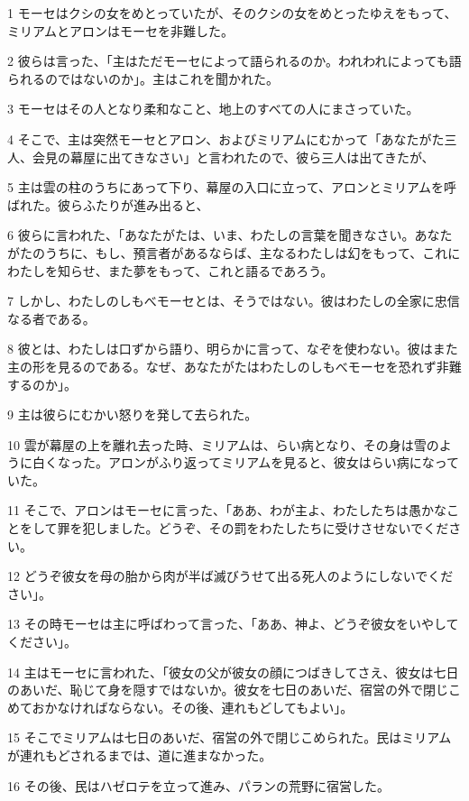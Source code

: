 \par 1 モーセはクシの女をめとっていたが、そのクシの女をめとったゆえをもって、ミリアムとアロンはモーセを非難した。
\par 2 彼らは言った、「主はただモーセによって語られるのか。われわれによっても語られるのではないのか」。主はこれを聞かれた。
\par 3 モーセはその人となり柔和なこと、地上のすべての人にまさっていた。
\par 4 そこで、主は突然モーセとアロン、およびミリアムにむかって「あなたがた三人、会見の幕屋に出てきなさい」と言われたので、彼ら三人は出てきたが、
\par 5 主は雲の柱のうちにあって下り、幕屋の入口に立って、アロンとミリアムを呼ばれた。彼らふたりが進み出ると、
\par 6 彼らに言われた、「あなたがたは、いま、わたしの言葉を聞きなさい。あなたがたのうちに、もし、預言者があるならば、主なるわたしは幻をもって、これにわたしを知らせ、また夢をもって、これと語るであろう。
\par 7 しかし、わたしのしもべモーセとは、そうではない。彼はわたしの全家に忠信なる者である。
\par 8 彼とは、わたしは口ずから語り、明らかに言って、なぞを使わない。彼はまた主の形を見るのである。なぜ、あなたがたはわたしのしもべモーセを恐れず非難するのか」。
\par 9 主は彼らにむかい怒りを発して去られた。
\par 10 雲が幕屋の上を離れ去った時、ミリアムは、らい病となり、その身は雪のように白くなった。アロンがふり返ってミリアムを見ると、彼女はらい病になっていた。
\par 11 そこで、アロンはモーセに言った、「ああ、わが主よ、わたしたちは愚かなことをして罪を犯しました。どうぞ、その罰をわたしたちに受けさせないでください。
\par 12 どうぞ彼女を母の胎から肉が半ば滅びうせて出る死人のようにしないでください」。
\par 13 その時モーセは主に呼ばわって言った、「ああ、神よ、どうぞ彼女をいやしてください」。
\par 14 主はモーセに言われた、「彼女の父が彼女の顔につばきしてさえ、彼女は七日のあいだ、恥じて身を隠すではないか。彼女を七日のあいだ、宿営の外で閉じこめておかなければならない。その後、連れもどしてもよい」。
\par 15 そこでミリアムは七日のあいだ、宿営の外で閉じこめられた。民はミリアムが連れもどされるまでは、道に進まなかった。
\par 16 その後、民はハゼロテを立って進み、パランの荒野に宿営した。

